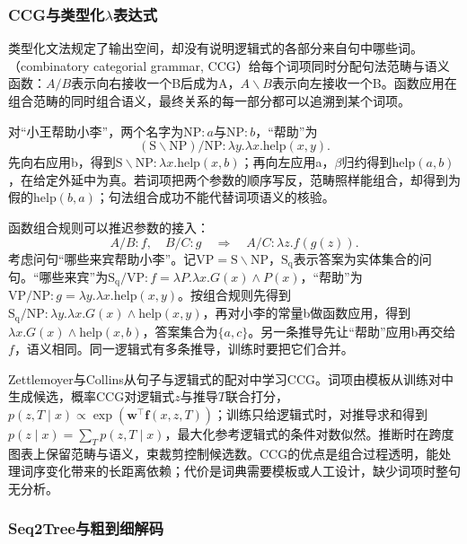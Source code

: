 \subsubsection{CCG与类型化\texorpdfstring{$\lambda$}{lambda}表达式}
\label{sec:nlp-analysis-ccg}

类型化文法规定了输出空间，却没有说明逻辑式的各部分来自句中哪些词。（combinatory categorial grammar, CCG）给每个词项同时分配句法范畴与语义函数：$A/B$表示向右接收一个B后成为A，$A\backslash B$表示向左接收一个B。函数应用在组合范畴的同时组合语义，最终关系的每一部分都可以追溯到某个词项。

对“小王帮助小李”，两个名字为$\mathrm{NP}:a$与$\mathrm{NP}:b$，“帮助”为
\[
 (\mathrm S\backslash\mathrm{NP})/\mathrm{NP}
 :\lambda y.\lambda x.\mathrm{help}(x,y).
\]
先向右应用b，得到$\mathrm S\backslash\mathrm{NP}:\lambda x.\mathrm{help}(x,b)$；再向左应用a，$\beta$归约得到$\mathrm{help}(a,b)$，在给定外延中为真。若词项把两个参数的顺序写反，范畴照样能组合，却得到为假的$\mathrm{help}(b,a)$；句法组合成功不能代替词项语义的核验。

函数组合规则可以推迟参数的接入：
\[
 A/B:f,\quad B/C:g
 \quad\Longrightarrow\quad A/C:\lambda z.f(g(z)).
\]
考虑问句“哪些来宾帮助小李”。记$\mathrm{VP}=\mathrm S\backslash\mathrm{NP}$，$\mathrm{S_q}$表示答案为实体集合的问句。“哪些来宾”为$\mathrm{S_q}/\mathrm{VP}:f=\lambda P.\lambda x.G(x)\land P(x)$，“帮助”为$\mathrm{VP}/\mathrm{NP}:g=\lambda y.\lambda x.\mathrm{help}(x,y)$。按组合规则先得到$\mathrm{S_q}/\mathrm{NP}:\lambda y.\lambda x.G(x)\land\mathrm{help}(x,y)$，再对小李的常量b做函数应用，得到$\lambda x.G(x)\land\mathrm{help}(x,b)$，答案集合为$\{a,c\}$。另一条推导先让“帮助”应用b再交给$f$，语义相同。同一逻辑式有多条推导，训练时要把它们合并。

Zettlemoyer与Collins从句子与逻辑式的配对中学习CCG。词项由模板从训练对中生成候选，概率CCG对逻辑式$z$与推导$T$联合打分，$p(z,T\mid x)\propto\exp(\bm w^{\top}\bm f(x,z,T))$；训练只给逻辑式时，对推导求和得到$p(z\mid x)=\sum_Tp(z,T\mid x)$，最大化参考逻辑式的条件对数似然。推断时在跨度图表上保留范畴与语义，束裁剪控制候选数。CCG的优点是组合过程透明，能处理词序变化带来的长距离依赖；代价是词典需要模板或人工设计，缺少词项时整句无分析。

\subsubsection{Seq2Tree与粗到细解码}
\label{sec:nlp-analysis-logic-generation}

